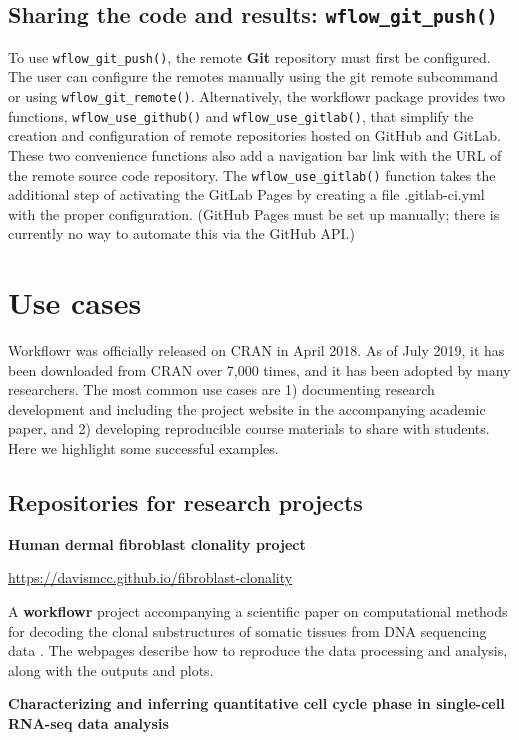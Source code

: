 \documentclass[9pt,a4paper]{extarticle}
\begin{document}
\subsection*{Sharing the code and results: \texttt{wflow\_git\_push()}}

To use \texttt{wflow\_git\_push()}, the remote \textbf{Git} repository must first be
configured. The user can configure the remotes manually using the git
remote subcommand or using \texttt{wflow\_git\_remote()}. Alternatively, the
workflowr package provides two functions, \texttt{wflow\_use\_github()} and
\texttt{wflow\_use\_gitlab()}, that simplify the creation and configuration of
remote repositories hosted on GitHub and GitLab. These two convenience
functions also add a navigation bar link with the URL of the remote
source code repository. The \texttt{wflow\_use\_gitlab()} function takes the
additional step of activating the GitLab Pages by creating a file
.gitlab-ci.yml with the proper configuration. (GitHub Pages must be set
up manually; there is currently no way to automate this via the GitHub
API.)


\section*{Use cases}

Workflowr was officially released on CRAN in April 2018. As of July
2019, it has been downloaded from CRAN over 7,000 times, and it has been
adopted by many researchers. The most common use cases are 1)
documenting research development and including the project website in
the accompanying academic paper, and 2) developing reproducible course
materials to share with students. Here we highlight some successful
examples.

\subsection*{Repositories for research projects}

\textbf{Human dermal fibroblast clonality project}

\url{https://davismcc.github.io/fibroblast-clonality}

A \textbf{workflowr} project accompanying a scientific paper on computational
methods for decoding the clonal substructures of somatic tissues from
DNA sequencing data \cite{McCarthy2018}. The webpages describe how to
reproduce the data processing and analysis, along with the outputs and
plots.

\textbf{Characterizing and inferring quantitative cell cycle phase in
single-cell RNA-seq data analysis}
\end{document}
